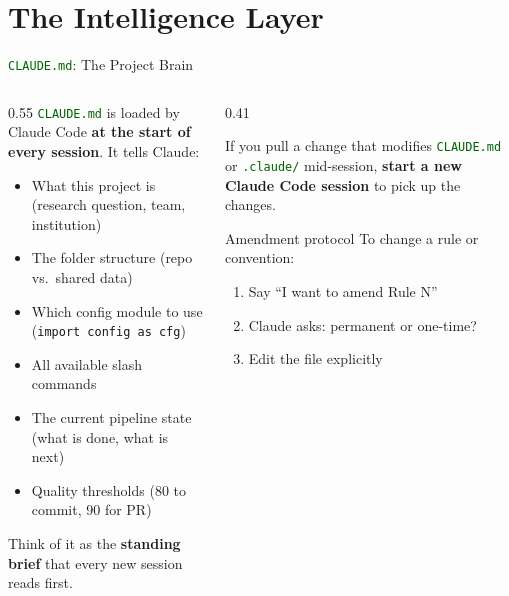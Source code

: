 \documentclass[aspectratio=169,11pt,dvipsnames]{beamer}
\newcommand{\file}[1]{\textcolor{darkgreen}{\nolinkurl{#1}}}
\begin{document}
\section{The Intelligence Layer}

\begin{frame}{\file{CLAUDE.md}: The Project Brain}
  \begin{columns}[T]
    \begin{column}{0.55\textwidth}
      \file{CLAUDE.md} is loaded by Claude Code \textbf{at the start of every session}.
      It tells Claude:
      \begin{itemize}\setlength\itemsep{4pt}
        \item What this project is (research question, team, institution)
        \item The folder structure (repo vs.\ shared data)
        \item Which config module to use (\texttt{import config as cfg})
        \item All available slash commands
        \item The current pipeline state (what is done, what is next)
        \item Quality thresholds (80 to commit, 90 for PR)
      \end{itemize}
      \vspace{0.2cm}
      Think of it as the \textbf{standing brief} that every new session reads first.
    \end{column}
    \begin{column}{0.41\textwidth}
      \begin{greenbox}[title=Practical implication]
        \small If you pull a change that modifies \file{CLAUDE.md}
        or \file{.claude/} mid-session, \textbf{start a new Claude
        Code session} to pick up the changes.
      \end{greenbox}
      \vspace{0.3cm}
      \begin{block}{Amendment protocol}
        \small To change a rule or convention:
        \begin{enumerate}
          \item Say ``I want to amend Rule N''
          \item Claude asks: permanent or one-time?
          \item Edit the file explicitly
        \end{enumerate}
      \end{block}
    \end{column}
  \end{columns}
\end{frame}
\end{document}

